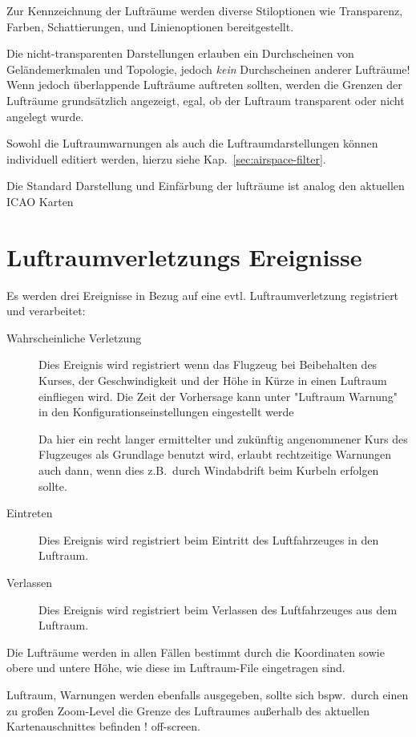 Zur Kennzeichnung der Lufträume werden diverse Stiloptionen wie Transparenz, Farben,
Schattierungen, und Linienoptionen bereitgestellt. 

Die nicht-transparenten  Darstellungen erlauben ein Durchscheinen von
Geländemerkmalen und Topologie, jedoch \emph{kein} Durchscheinen anderer Lufträume!
Wenn jedoch überlappende Lufträume auftreten sollten, werden die Grenzen der
Lufträume grundsätzlich angezeigt, egal, ob der Luftraum transparent oder nicht angelegt wurde.

Sowohl die Luftraumwarnungen als auch die Luftraumdarstellungen können individuell editiert werden,
hierzu siehe Kap.~\ref{sec:airspace-filter}.

Die Standard Darstellung und Einfärbung der lufträume ist analog den aktuellen ICAO Karten

\section{Luftraumverletzungs Ereignisse}

Es werden drei Ereignisse in Bezug auf eine evtl. Luftraumverletzung  registriert und verarbeitet:
\begin{description}
\item[Wahrscheinliche Verletzung] Dies Ereignis wird registriert
wenn das Flugzeug bei Beibehalten des Kurses, der Geschwindigkeit und der Höhe in Kürze in einen Luftraum einfliegen wird.
Die Zeit der Vorhersage kann unter "Luftraum Warnung" in den Konfigurationseinstellungen eingestellt werde

Da hier ein recht langer ermittelter und zukünftig angenommener Kurs des Flugzeuges als
 Grundlage benutzt wird, erlaubt \xc rechtzeitige Warnungen auch dann, wenn dies z.B.\
 durch Windabdrift beim Kurbeln erfolgen sollte.
\item[Eintreten] Dies Ereignis wird registriert beim Eintritt des Luftfahrzeuges in den Luftraum.
\item[Verlassen] Dies Ereignis wird registriert beim Verlassen des Luftfahrzeuges aus dem Luftraum.
\end{description}
Die Lufträume werden in allen Fällen bestimmt durch die Koordinaten sowie obere und
untere Höhe, wie diese im Luftraum-File eingetragen sind.

Luftraum, Warnungen werden ebenfalls ausgegeben, sollte sich bspw.\ durch einen zu großen Zoom-Level
 die  Grenze des Luftraumes außerhalb des aktuellen Kartenauschnittes befinden !
off-screen.

